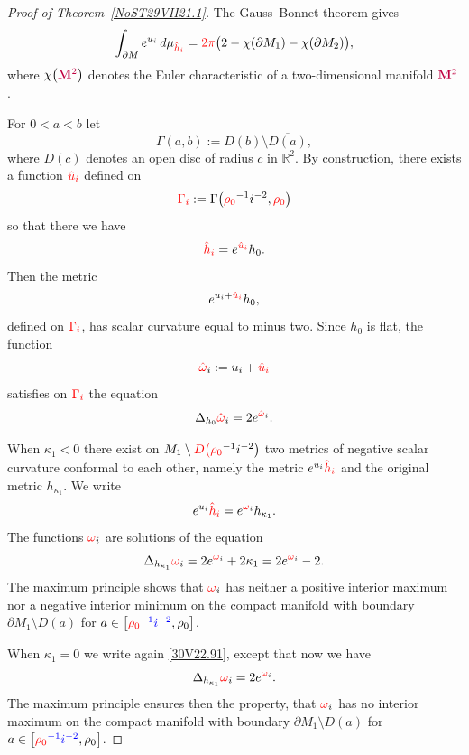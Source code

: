 \documentclass[10pt,a4paper]{article}
\numberwithin{equation}{section}
\newcommand{\blue}[1]{{\color{blue}#1}}
\newcommand{\hato}{\red{\omega}}
\newcommand{\hhi}{{\red{\hat h_{i}}}}
\newcommand{\hmv}{\red{\hat \omega}}
\newcommand{\mage}[1]{#1}%
\newcommand{\purple}[1]{{\color{purple}#1}}
\newcommand{\R}{\mathbb R}
\newcommand{\red}[1]{{\color{red}#1}}
\newcommand{\rhozero}{\red{\rho_0}}
\newcommand{\twodimN}{\purple{\mathbf{M}^2}}
\newcommand{\zui}{{\red{\hat u_{i}}}}
\begin{document}
\begin{proof}[Proof of Theorem~\ref{NoST29VII21.1}]
The Gauss--Bonnet theorem gives{\samepage
\begin{equation*}%
 \int_{\partial M } {\rm e}^{u_i} \,{\rm d}\mu_{\hhi }= \red{2\pi}
 \big(
 2-\chi(\partial M_1) - \chi(\partial M_2)
 \big),
\end{equation*}
where $ {\chi}\big(\twodimN\big)$ denotes the Euler characteristic of a two-dimensional manifold $\twodimN$.}

For $0<a<b$ let
\[
\Gamma(a,b) := D(b) \setminus \overline{D(a)},
\]
where $D(c)$ denotes an open disc of radius $c$ in $\R^2$.
By construction,
there exists a function $\zui $ defined
on
\[
 \red{\Gamma_i}:=
 \Gamma\big(\rhozero^{-1} i^{-2}, \rhozero\big)
\]
so that there we have
\begin{equation*}%
 \hhi ={\rm e}^{ \zui } h_0.
\end{equation*}
Then the metric
\[
 {\rm e}^{ u_i+\zui } h_0,
\]
defined on $\red{\Gamma_i}$, has scalar curvature equal to minus two.
Since $h_0$ is flat, the function
\begin{equation*}%
 \hmv_i:= u_i+\zui
\end{equation*}
satisfies on $\red{\Gamma_i}$ the equation
\begin{equation}\label{NoS31VII21.32}
 \Delta_{h_0 }\hmv_i = 2 {\rm e}^{\hmv_i}.
\end{equation}

When $\kappa_{1}<0$ there exist on $M_1\setminus \red{D\big(}\rhozero^{-1} i^{-2}\big)$ two metrics of negative scalar curvature conformal to each other, namely the metric ${\rm e}^{u_i} \hhi $ and the original metric $h_{\kappa_1}$. We write
 \begin{equation}\label{30V22.91}
 {\rm e}^{u_i} \hhi = {\rm e}^{\hato_i} h_{\kappa_1}.
 \end{equation}
 The functions $\hato_i$ are solutions of the equation
%
\begin{equation*}%
 \Delta_{h_{\kappa_1}} \hato_i = 2 {\rm e}^{\hato_i} + 2 \kappa_1 = 2 {\rm e}^{\hato_i} - 2
.
\end{equation*}
%
The maximum principle shows that $\hato_i$ has neither a positive
 interior maximum nor a negative interior minimum on the compact manifold with boundary $ \partial M_1 \setminus D(a)$ for $a\in\big[\blue{\rhozero^{-1} i^{-2}},\rho_0\big]$.

When $\kappa_{1}=0$
we write again \eqref{30V22.91}, except that now we have
\begin{equation*}%
 \Delta_{h_{\kappa_1}} \hato_i = 2 {\rm e}^{\hato_i}.
\end{equation*}
The maximum principle ensures then the property, that $\hato_i$ has no interior \mage{maximum} on the compact manifold with boundary $ \partial M_1 \setminus D(a)$ for $a\in\big[\blue{\rhozero^{-1} i^{-2}},\rho_0\big]$.


\end{proof}
\end{document}
